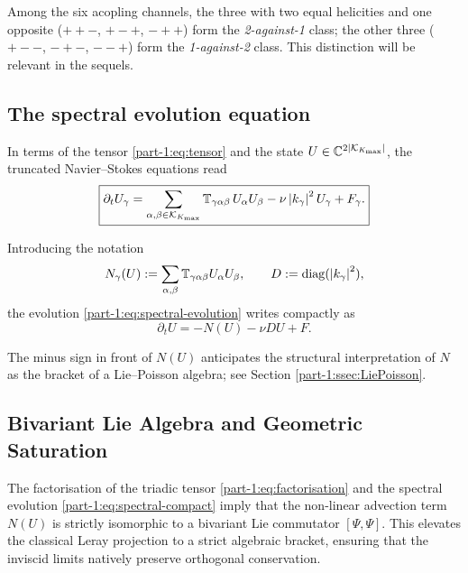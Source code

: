 \begin{remark}\label{part-1:rem:ac-two-classes}
Among the six acopling channels, the three with two equal helicities 
and one opposite ($++-$, $+-+$, $-++$) form the \emph{2-against-1} 
class; the other three ($+--$, $-+-$, $--+$) form the 
\emph{1-against-2} class. This distinction will be relevant in the 
sequels.
\end{remark}

\subsection{The spectral evolution equation}
\label{part-1:ssec:spectral-eq}

In terms of the tensor \eqref{part-1:eq:tensor} and the state 
$U\in\mathbb{C}^{2\left\lvert \mathcal{K}_{K_{\max}} \right\rvert}$, the truncated Navier--Stokes equations 
read
\begin{equation}\label{part-1:eq:spectral-evolution}
\boxed{
\partial_t U_\gamma 
= \sum_{\alpha,\beta\in\mathcal{K}_{K_{\max}}} \mathbb{T}_{\gamma\alpha\beta}\, U_\alpha U_\beta
- \nu\left\lvert k_\gamma \right\rvert^2 U_\gamma 
+ F_\gamma.
}
\end{equation}

Introducing the notation
\begin{equation}\label{part-1:eq:N-def}
N_\gamma(U) := \sum_{\alpha,\beta} \mathbb{T}_{\gamma\alpha\beta} U_\alpha U_\beta,
\qquad
D := \operatorname{diag}(\left\lvert k_\gamma \right\rvert^2),
\end{equation}
the evolution \eqref{part-1:eq:spectral-evolution} writes compactly as
\begin{equation}\label{part-1:eq:spectral-compact}
\partial_t U = -N(U) - \nu D U + F.
\end{equation}

\begin{remark}\label{part-1:rem:sign}
The minus sign in front of $N(U)$ anticipates the structural 
interpretation of $N$ as the bracket of a Lie--Poisson algebra; see 
Section \ref{part-1:ssec:LiePoisson}.
\end{remark}

\subsection{Bivariant Lie Algebra and Geometric Saturation}
\label{part-1:ssec:lean-lie}

The factorisation of the triadic tensor \eqref{part-1:eq:factorisation} and the spectral evolution \eqref{part-1:eq:spectral-compact} imply that the non-linear advection term $N(U)$ is strictly isomorphic to a bivariant Lie commutator $[\Psi, \Psi]$. This elevates the classical Leray projection to a strict algebraic bracket, ensuring that the inviscid limits natively preserve orthogonal conservation.

